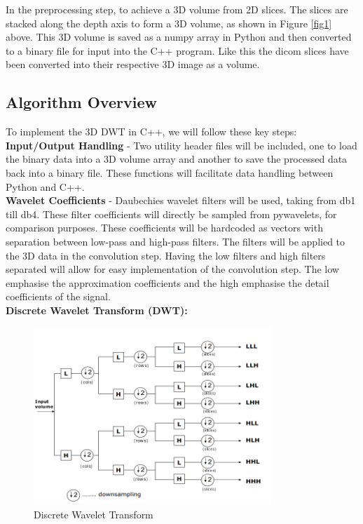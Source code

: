 \documentclass{article}
\begin{document}
In the preprocessing step, to achieve a 3D volume from 2D slices. The slices are stacked along the depth axis to form a 3D volume, as shown in Figure \ref{fig1} above. This 3D volume is saved as a numpy array in Python and then converted to a binary file for input into the C++ program. Like this the dicom slices have been converted into their respective 3D image as a volume.\\

\subsection{Algorithm Overview}
To implement the 3D DWT in C++, we will follow these key steps:\\

\textbf{Input/Output Handling} - Two utility header files will be included, one to load the binary data into a 3D volume array and another to save the processed data back into a binary file. These functions will facilitate data handling between Python and C++.\\

\textbf{Wavelet Coefficients} - Daubechies wavelet filters will be used, taking from db1 till db4. These filter coefficients will directly be sampled from pywavelets, for comparison purposes. These coefficients will be hardcoded as vectors with separation between low-pass and high-pass filters. The filters will be applied to the 3D data in the convolution step. Having the low filters and high filters separated will allow for easy implementation of the convolution step. The low emphasise the approximation coefficients and the high emphasise the detail coefficients of the signal.\\

\textbf{Discrete Wavelet Transform (DWT):} 
\begin{figure}[H]
    \centering
    \includegraphics[width=0.8\textwidth]{assets/dwt.png}
    \caption{Discrete Wavelet Transform \cite{Prochazka2011}}
    \label{fig2}
\end{figure}
\end{document}
